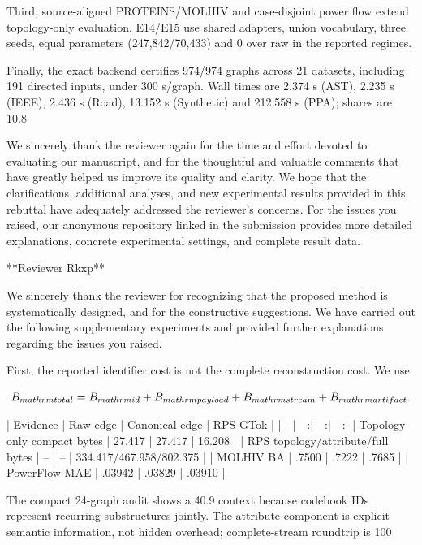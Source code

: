 Third, source-aligned PROTEINS/MOLHIV and case-disjoint power flow extend
topology-only evaluation. E14/E15 use shared adapters, union vocabulary, three
seeds, equal parameters (247,842/70,433) and 0%
over raw in the reported regimes.

Finally, the exact backend certifies 974/974 graphs across 21 datasets,
including 191 directed inputs, under 300 s/graph. Wall times are 2.374 s (AST),
2.235 s (IEEE), 2.436 s (Road), 13.152 s (Synthetic) and 212.558 s (PPA);
shares are 10.8%

We sincerely thank the reviewer again for the time and effort devoted to
evaluating our manuscript, and for the thoughtful and valuable comments that
have greatly helped us improve its quality and clarity. We hope that the
clarifications, additional analyses, and new experimental results provided in
this rebuttal have adequately addressed the reviewer's concerns. For the
issues you raised, our anonymous repository linked in the submission provides
more detailed explanations, concrete experimental settings, and complete
result data.

**Reviewer Rkxp**

We sincerely thank the reviewer for recognizing that the proposed method is
systematically designed, and for the constructive suggestions. We have carried
out the following supplementary experiments and provided further explanations
regarding the issues you raised.

First, the reported identifier cost is not the complete reconstruction cost.
We use

$$
B_{\\mathrm{total}}=B_{\\mathrm{id}}+B_{\\mathrm{payload}}+B_{\\mathrm{stream}}+B_{\\mathrm{artifact}}.
$$

| Evidence | Raw edge | Canonical edge | RPS-GTok |
|---|---:|---:|---:|
| Topology-only compact bytes | 27.417 | 27.417 | 16.208 |
| RPS topology/attribute/full bytes | -- | -- | 334.417/467.958/802.375 |
| MOLHIV BA | .7500 | .7222 | .7685 |
| PowerFlow MAE | .03942 | .03829 | .03910 |

The compact 24-graph audit shows a 40.9%
context because codebook IDs represent recurring substructures jointly. The
attribute component is explicit semantic information, not hidden overhead;
complete-stream roundtrip is 100%

